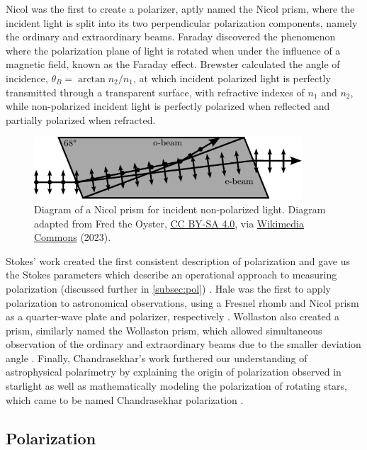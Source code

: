 Nicol was the first to create a polarizer, aptly named the Nicol prism, where the incident light is split into its two perpendicular polarization components, namely the ordinary and extraordinary beams. Faraday discovered the phenomenon where the polarization plane of light is rotated when under the influence of a magnetic field, known as the Faraday effect. Brewster calculated the angle of incidence, $\theta_{B} = \arctan{n_{2} / n_{1}}$, at which incident polarized light is perfectly transmitted through a transparent surface, with refractive indexes of $n_{1}$ and $n_{2}$, while non-polarized incident light is perfectly polarized when reflected and partially polarized when refracted.

\begin{figure}[t]
    \centering
    \includegraphics[width=10cm]{figures/2_Nicol_prism.pdf}
    \caption{Diagram of a Nicol prism for incident non-polarized light. Diagram adapted from Fred the Oyster, \protect\href{https://creativecommons.org/licenses/by-sa/4.0/}{CC BY-SA 4.0}, via \protect\href{https://en.m.wikipedia.org/wiki/File:Nicol_prism.svg}{Wikimedia Commons} (2023).}
    \label{fig:Nicol_prism}
\end{figure}

Stokes' work created the first consistent description of polarization and gave us the Stokes parameters which describe an operational approach to measuring polarization (discussed further in \autoref{subsec:pol}) \citep{Stokes}. Hale was the first to apply polarization to astronomical observations, using a Fresnel rhomb and Nicol prism as a quarter-wave plate and polarizer, respectively \citep{Hale_pre,Hale_post}. Wollaston also created a prism, similarly named the Wollaston prism, which allowed simultaneous observation of the ordinary and extraordinary beams due to the smaller deviation angle \citep{WollPrism}. Finally, Chandrasekhar's work furthered our understanding of astrophysical polarimetry by explaining the origin of polarization observed in starlight as well as mathematically modeling the polarization of rotating stars, which came to be named Chandrasekhar polarization \citep{chandrasekhar}.

\subsection{Polarization}\label{subsec:pol}

